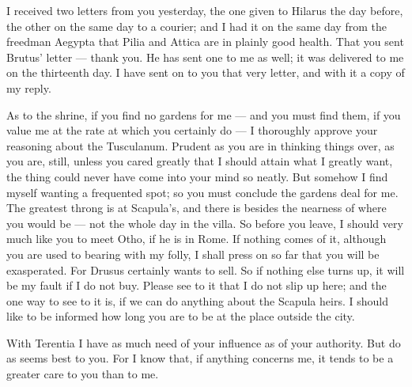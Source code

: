 

 I received two letters from you yesterday, the one given to Hilarus the day before, the other on the same day to a courier; and I had it on the same day from the freedman Aegypta that Pilia and Attica are in plainly good health. That you sent Brutus' letter --- thank you. He has sent one to me as well; it was delivered to me on the thirteenth day. I have sent on to you that very letter, and with it a copy of my reply.

 As to the shrine, if you find no gardens for me --- and you must find them, if you value me at the rate at which you certainly do --- I thoroughly approve your reasoning about the Tusculanum. Prudent as you are in thinking things over, as you are, still, unless you cared greatly that I should attain what I greatly want, the thing could never have come into your mind so neatly. But somehow I find myself wanting a frequented spot; so you must conclude the gardens deal for me. The greatest throng is at Scapula's, and there is besides the nearness of where you would be --- not the whole day in the villa. So before you leave, I should very much like you to meet Otho, if he is in Rome. If nothing comes of it, although you are used to bearing with my folly, I shall press on so far that you will be exasperated. For Drusus certainly wants to sell. So if nothing else turns up, it will be my fault if I do not buy. Please see to it that I do not slip up here; and the one way to see to it is, if we can do anything about the Scapula heirs. I should like to be informed how long you are to be at the place outside the city.

 With Terentia I have as much need of your influence as of your authority. But do as seems best to you. For I know that, if anything concerns me, it tends to be a greater care to you than to me.
